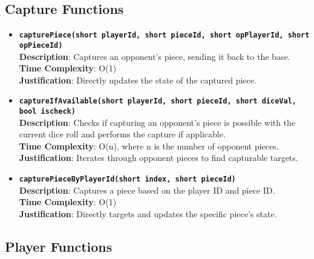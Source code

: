\documentclass{article}
\begin{document}
        \subsection{Capture Functions}
        
        \begin{itemize}
            \item \textbf{\texttt{capturePiece(short playerId, short pieceId, short opPlayerId, short opPieceId)}}\\
            \textbf{Description}: Captures an opponent's piece, sending it back to the base.\\
            \textbf{Time Complexity}: O(1)\\
            \textbf{Justification}: Directly updates the state of the captured piece.
            
            \item \textbf{\texttt{captureIfAvailable(short playerId, short pieceId, short diceVal, bool ischeck)}}\\
            \textbf{Description}: Checks if capturing an opponent's piece is possible with the current dice roll and performs the capture if applicable.\\
            \textbf{Time Complexity}: O(n), where n is the number of opponent pieces.\\
            \textbf{Justification}: Iterates through opponent pieces to find capturable targets.
            
            \item \textbf{\texttt{capturePieceByPlayerId(short index, short pieceId)}}\\
            \textbf{Description}: Captures a piece based on the player ID and piece ID.\\
            \textbf{Time Complexity}: O(1)\\
            \textbf{Justification}: Directly targets and updates the specific piece’s state.
        \end{itemize}
        
        \subsection{Player Functions}
        
\end{document}
